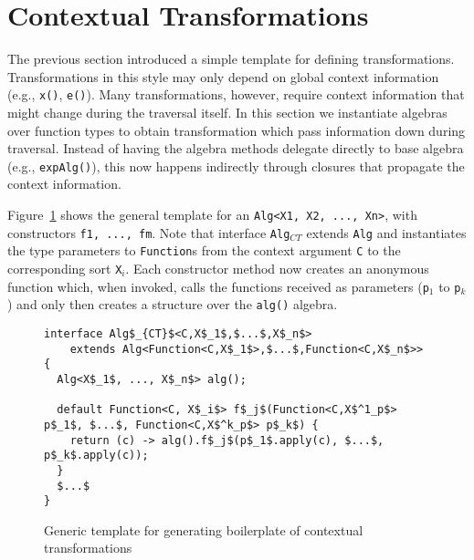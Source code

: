 \section{Contextual Transformations}\label{sec:contexttrans}

The previous section introduced a simple template for defining transformations.
Transformations in this style may only depend on global context information (e.g., \lstinline{x()}, \lstinline{e()}).
Many transformations, however, require context information that might change during the traversal itself.
In this section we instantiate algebras over function types to obtain transformation which pass information down during traversal.
Instead of having the algebra methods delegate directly to base algebra (e.g., \lstinline{expAlg()}), this now happens indirectly through closures that propagate the context information.

Figure~\ref{ctxTrafoTemplate} shows the general template for an \lstinline{Alg<X1, X2, ..., Xn>}, with constructors \lstinline{f1, ..., fm}.
Note that interface \lstinline{Alg}$_{CT}$ extends \lstinline{Alg} and instantiates the type parameters to \lstinline{Function}s from the context argument \lstinline{C} to the corresponding sort \lstinline{X}$_i$.
Each constructor method now creates an anonymous function which, when invoked, calls the functions received as parameters (\lstinline{p}$_1$ to \lstinline{p}$_k$) and only then creates a structure over the \lstinline{alg()} algebra.

\begin{figure}[t]
\nocaptionrule
\begin{lstlisting}[mathescape=true]
interface Alg$_{CT}$<C,X$_1$,$...$,X$_n$>
    extends Alg<Function<C,X$_1$>,$...$,Function<C,X$_n$>> {
  Alg<X$_1$, ..., X$_n$> alg();

  default Function<C, X$_i$> f$_j$(Function<C,X$^1_p$> p$_1$, $...$, Function<C,X$^k_p$> p$_k$) {
    return (c) -> alg().f$_j$(p$_1$.apply(c), $...$, p$_k$.apply(c));
  }
  $...$
}
\end{lstlisting}
\caption{Generic template for generating boilerplate of contextual transformations}
\label{ctxTrafoTemplate}
\end{figure}

